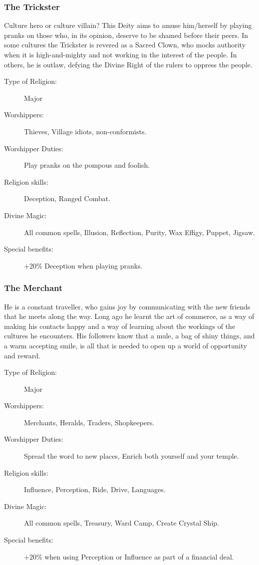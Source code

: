 \subsubsection{The Trickster}
Culture hero or culture villain? This Deity aims to amuse him/herself by playing pranks on those who, in its opinion, deserve to be shamed before their peers. In some cultures the Trickster is revered as a Sacred Clown, who mocks authority when it is high-and-mighty and not working in the interest of the people. In others, he is outlaw, defying the Divine Right of the rulers to oppress the people.

\begin{description}
\item[Type of Religion:] Major
\item[Worshippers:] Thieves, Village idiots, non-conformists.
\item[Worshipper Duties:] Play pranks on the pompous and foolish.
\item[Religion skills:] Deception, Ranged Combat.
\item[Divine Magic:] All common spells, Illusion, Reflection, Purity, Wax Effigy, Puppet, Jigsaw.
\item[Special benefits:] +20\% Deception when playing pranks.
\end{description}



\subsubsection{The Merchant}
He is a constant traveller, who gains joy by communicating with the new friends that he meets along the way. Long ago he learnt the art of commerce, as a way of making his contacts happy and a way of learning about the workings of the cultures he encounters. His followers know that a mule, a bag of shiny things, and a warm accepting smile, is all that is needed to open up a world of opportunity and reward.

\begin{description}
\item[Type of Religion:] Major
\item[Worshippers:] Merchants, Heralds, Traders, Shopkeepers.
\item[Worshipper Duties:] Spread the word to new places, Enrich both yourself and your temple. 
\item[Religion skills:] Influence, Perception, Ride, Drive, Languages.
\item[Divine Magic:] All common spells, Treasury, Ward Camp, Create Crystal Ship.
\item[Special benefits:] +20\% when using Perception or Influence as part of a financial deal.
\end{description}


